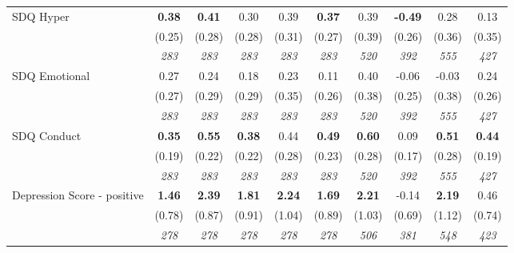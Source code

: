 \begin{tabular}{l c c c c c c c c c}
SDQ Hyper & \textbf{ 0.38 } & \textbf{ 0.41 } & 0.30 & 0.39 & \textbf{0.37} & 0.39 & \textbf{-0.49} & 0.28 & 0.13 \\
& (0.25) & (0.28) & (0.28) & (0.31) & (0.27) & (0.39) & (0.26) & (0.36) & (0.35) \\
& \textit{ 283 } & \textit{ 283 } & \textit{ 283 } & \textit{ 283 } & \textit{ 283 } & \textit{ 520 } & \textit{ 392 } & \textit{ 555 } & \textit{ 427 } \\
SDQ Emotional & 0.27 & 0.24 & 0.18 & 0.23 & 0.11 & 0.40 & -0.06 & -0.03 & 0.24 \\
& (0.27) & (0.29) & (0.29) & (0.35) & (0.26) & (0.38) & (0.25) & (0.38) & (0.26) \\
& \textit{ 283 } & \textit{ 283 } & \textit{ 283 } & \textit{ 283 } & \textit{ 283 } & \textit{ 520 } & \textit{ 392 } & \textit{ 555 } & \textit{ 427 } \\
SDQ Conduct & \textbf{ 0.35 } & \textbf{ 0.55 } & \textbf{ 0.38 } & 0.44 & \textbf{0.49} & \textbf{ 0.60 } & 0.09 & \textbf{ 0.51 } & \textbf{0.44} \\
& (0.19) & (0.22) & (0.22) & (0.28) & (0.23) & (0.28) & (0.17) & (0.28) & (0.19) \\
& \textit{ 283 } & \textit{ 283 } & \textit{ 283 } & \textit{ 283 } & \textit{ 283 } & \textit{ 520 } & \textit{ 392 } & \textit{ 555 } & \textit{ 427 } \\
Depression Score - positive & \textbf{ 1.46 } & \textbf{ 2.39 } & \textbf{ 1.81 } & \textbf{2.24} & \textbf{1.69} & \textbf{ 2.21 } & -0.14 & \textbf{ 2.19 } & 0.46 \\
& (0.78) & (0.87) & (0.91) & (1.04) & (0.89) & (1.03) & (0.69) & (1.12) & (0.74) \\
& \textit{ 278 } & \textit{ 278 } & \textit{ 278 } & \textit{ 278 } & \textit{ 278 } & \textit{ 506 } & \textit{ 381 } & \textit{ 548 } & \textit{ 423 } \\
\bottomrule
\end{tabular}
